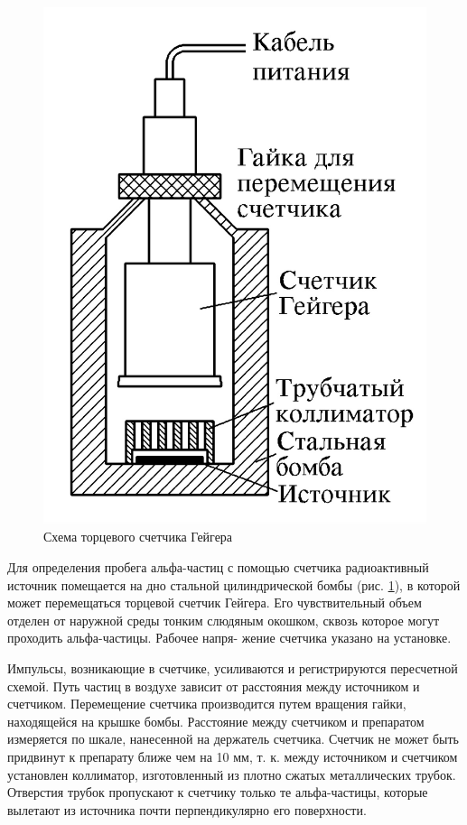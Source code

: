 \documentclass[a4paper, 12pt]{article}%
\begin{document}
	\begin{figure}
		\includegraphics[width=\linewidth]{images/Geyger.jpg}
		\caption{Схема торцевого счетчика Гейгера}
		\label{ris geyger}
	\end{figure}
	
	Для определения пробега альфа-частиц с помощью счетчика радиоактивный источник помещается на дно стальной цилиндрической бомбы
	(рис. \ref{ris geyger}), в которой может перемещаться торцевой счетчик Гейгера. Его
	чувствительный объем отделен от наружной среды тонким слюдяным
	окошком, сквозь которое могут проходить альфа-частицы. Рабочее напря-
	жение счетчика указано на установке.
	
	Импульсы, возникающие в счетчике, усиливаются и регистрируются пересчетной схемой. Путь частиц в воздухе зависит от расстояния между источником и счетчиком. Перемещение счетчика производится путем вращения гайки, находящейся на крышке бомбы. Расстояние
	между счетчиком и препаратом измеряется по шкале, нанесенной на
	держатель счетчика. Счетчик не может быть придвинут к препарату ближе чем на 10 мм, т. к. между источником и счетчиком установлен коллиматор, изготовленный из плотно сжатых металлических трубок. Отверстия трубок пропускают к счетчику только те альфа-частицы, которые вылетают из источника почти перпендикулярно его поверхности.
	
\end{document}

